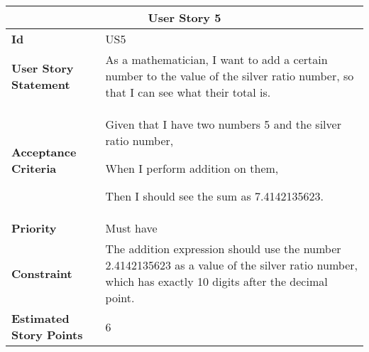 \hspace{1cm}
\begin{center}
\begin{tabular}{ | m{2cm} | m{12cm} | } 

 \hline
 \multicolumn{2}{|c|}{\textbf{User Story 5}} \\

\hline
\textbf{Id} & US5 \\ 

\hline
\textbf{User Story Statement} & As a mathematician, I want to add a certain number to the value of the silver ratio number, so that I can see what their total is. \\ 

\hline
\textbf{Acceptance Criteria} & Given that I have two numbers 5 and the silver ratio number,

When I perform addition on them,

Then I should see the sum as 7.4142135623. \\ 

\hline
\textbf{Priority} & Must have \\ 

\hline
\textbf{Constraint} & The addition expression should use the number 2.4142135623 as a value of the silver ratio number, which has exactly 10 digits after the decimal point.\\ 

\hline
\textbf{Estimated Story Points} & 6 \\ 
\hline

\end{tabular}
\end{center}

